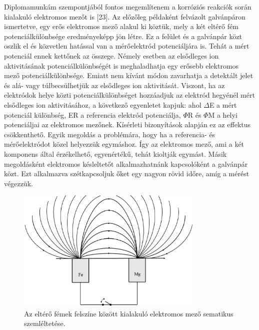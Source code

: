 Diplomamunkám szempontjából fontos megemlítenem a korróziós reakciók során kialakuló elektromos mezőt is [23]. Az előzőleg példaként felvázolt galvánpáron ismertetve, egy erős elektromos mező alakul ki köztük, mely a két eltérő fém potenciálkülönbsége eredményeképp jön létre. Ez a felület és a galvánpár közt oszlik el és közvetlen hatással van a mérőelektród potenciáljára is. Tehát a mért potenciál ennek kettőnek az összege. Némely esetben az elsődleges ion aktivitásának potenciálkülönbségét is meghaladhatja egy erősebb elektromos mező potenciálkülönbsége. Emiatt nem kívánt módon zavarhatja a detektált jelet és alá- vagy túlbecsülhetjük az elsődleges ion aktivitását. Viszont, ha az elektródok helye közti potenciálkülönbséget hozzáadjuk az elektród hegyénél mért elsődleges ion aktivitásához, a következő egyenletet kapjuk:
ahol $\Delta$E a mért potenciál különbség, ER a referencia elektród potenciálja, $\Phi$R és $\Phi$M a helyi potenciáljai az elektromos mezőnek. 
Kísérleti bizonyítások alapján ez az effektus csökkenthető. Egyik megoldás a problémára, hogy ha a referencia- és mérőelektródot közel helyezzük egymáshoz. Így az elektromos mező, ami a két komponens által érzékelhető, egyenértékű, tehát kioltják egymást. Másik megoldásként elektromos késleltetőt alkalmazhatnánk kapcsolóként a galvánpár közt. Ezt alkalmazva szétkapcsoljuk őket egy nagyon rövid időre, amíg a mérést végezzük.

\begin{figure}
\centering
\includegraphics[width=0.8\textwidth]{img/field.eps}
\caption{Az eltérő fémek felszíne között kialakuló elektromos mező sematikus szemléltetése.}
\label{fig:field}
\end{figure}
